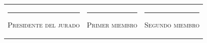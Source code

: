 \documentclass{academic-exam}
\begin{document}
\vspace{1.6em}
{\small
\begin{tabularx}{\textwidth}{@{}X X X@{}}
  \centering\rule{0.85\linewidth}{0.4pt}\par
  \centering\scshape Presidente del jurado &
  \centering\rule{0.85\linewidth}{0.4pt}\par
  \centering\scshape Primer miembro &
  \centering\rule{0.85\linewidth}{0.4pt}\par
  \centering\scshape Segundo miembro
  \tabularnewline
\end{tabularx}}

\findelexamen
\end{document}
